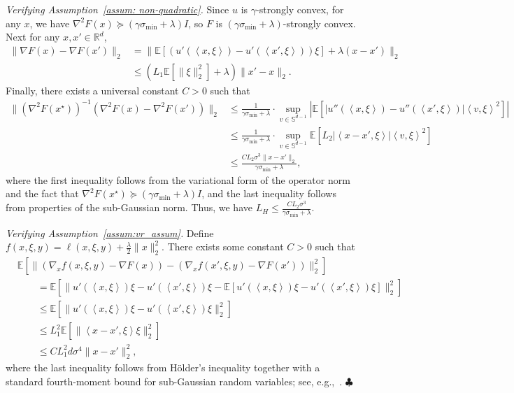 \documentclass[11pt,twoside]{article}
\numberwithin{equation}{section}
\newcommand{\EE}{\mathbb{E}}
\newcommand{\RR}{\mathbb{R}}
\newcommand{\abs}[1]{\left| #1 \right|}
\newcommand{\1}{\mathbf{1}}
\newcommand{\dotp}[1]{\left\langle #1\right\rangle}
\theoremstyle{remark}
\theoremstyle{plain}
\newcommand{\liph}{L_H}
\begin{document}
\noindent\emph{Verifying Assumption~\ref{assum: non-quadratic}.}
Since $u$ is $\gamma$-strongly convex, for any $x$, we have $\nabla^2 F(x)\succeq (\gamma  \sigma_{\min}+\lambda) I$,
so $F$ is $(\gamma  \sigma_{\min}+ \lambda)$-strongly convex. 
Next for any  $x,x'\in\RR^d$,
\begin{align*}
\|\nabla F(x)-\nabla F(x')\|_2 &= \|\EE[(u'(\dotp{x,\xi} )- u'(\dotp{x',\xi}))\xi] + \lambda (x - x')\|_2\\
&\le  (L_1\EE[\|\xi\|_2^2] + \lambda) \|x' - x\|_2.
\end{align*}
Finally,
there exists a universal constant $C>0$ such that
\begin{align*}
\|(\nabla^2 F(x^\star))^{-1}(\nabla^2 F(x)-\nabla^2 F(x'))\|_2 &\leq \frac{1}{\gamma  \sigma_{\min}+ \lambda} \cdot \sup_{v \in \mathbb{S}^{d-1}} |\EE[ |u''(\dotp{x,\xi})-u''(\dotp{x',\xi}) | \dotp{v,\xi}^2]| \\
&\le  \frac{1}{\gamma  \sigma_{\min}+ \lambda} \cdot \sup_{v \in \mathbb{S}^{d-1}} \EE[ L_2 \abs{\dotp{x-x',\xi}} \dotp{v,\xi}^2]\\
&\le  \frac{CL_2 \sigma^3 \|x - x'\|_2}{\gamma  \sigma_{\min}+ \lambda},
\end{align*}
where the  first inequality follows from the variational form of the operator norm and the fact that $\nabla^2 F(x^\star)\succeq (\gamma  \sigma_{\min}+ \lambda) I$, and the last inequality follows from properties of the sub-Gaussian norm. Thus, we have $\liph\leq \frac{ CL_2 \sigma^3}{\gamma  \sigma_{\min} + \lambda}$.

\noindent \emph{Verifying Assumption~\ref{assum:vr_assum}.} Define $f(x,\xi, y) = \ell(x,\xi,y) + \frac{\lambda}{2} \|x\|_2^2$. There exists some constant $C>0$ such that
\begin{align*}
&\EE[ \| (\nabla_x f(x,\xi, y) - \nabla F(x))  - (\nabla_x f(x', \xi, y) - \nabla F(x')) \|_2^2] \\
&\qquad = \EE[ \|u'(\dotp{x,\xi}) \xi  - u'(\dotp{x',\xi}) \xi  - \EE[u'(\dotp{x,\xi}) \xi  - u'(\dotp{x',\xi}) \xi  ] \|_2^2]\\
&\qquad \le   \EE[ \|u'(\dotp{x,\xi}) \xi  - u'(\dotp{x',\xi}) \xi \|_2^2] \\	
&\qquad \le   L_1^2 \EE[\|\dotp{x-x',\xi} \xi\|_2^2]\\
&\qquad \le CL_1^2 d\sigma^4 \|x-x'\|_2^2,
\end{align*}
where the last inequality follows from Hölder's inequality together with a standard fourth-moment bound for sub-Gaussian random variables; see, e.g.,~\cite[Proposition 2.6.6]{vershynin2018high}.  
\hfill $\clubsuit$
\end{document}

